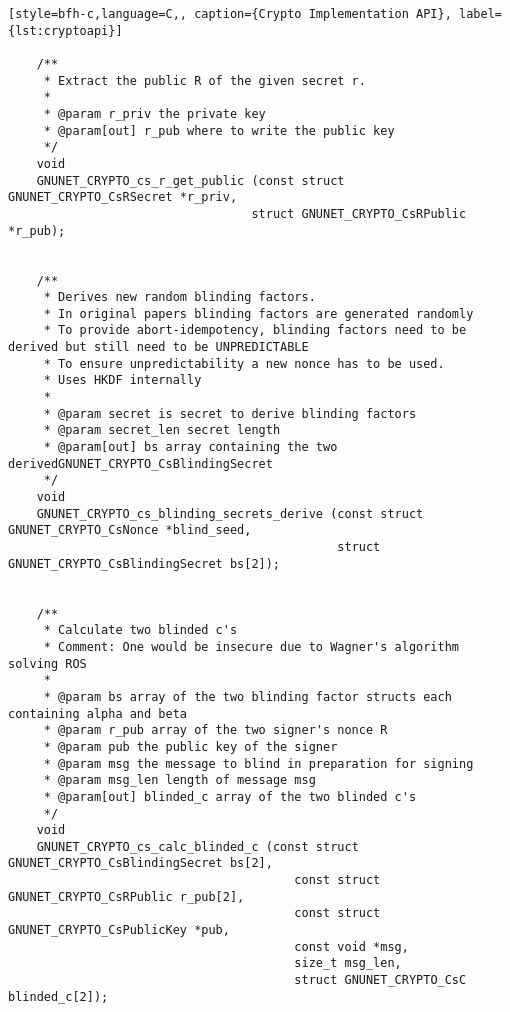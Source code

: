 \begin{lstlisting}[style=bfh-c,language=C,, caption={Crypto Implementation API}, label={lst:cryptoapi}]
    
    /**
     * Extract the public R of the given secret r.
     *
     * @param r_priv the private key
     * @param[out] r_pub where to write the public key
     */
    void
    GNUNET_CRYPTO_cs_r_get_public (const struct GNUNET_CRYPTO_CsRSecret *r_priv,
                                  struct GNUNET_CRYPTO_CsRPublic *r_pub);
    
    
    /**
     * Derives new random blinding factors.
     * In original papers blinding factors are generated randomly
     * To provide abort-idempotency, blinding factors need to be derived but still need to be UNPREDICTABLE
     * To ensure unpredictability a new nonce has to be used.
     * Uses HKDF internally
     * 
     * @param secret is secret to derive blinding factors
     * @param secret_len secret length
     * @param[out] bs array containing the two derivedGNUNET_CRYPTO_CsBlindingSecret
     */
    void
    GNUNET_CRYPTO_cs_blinding_secrets_derive (const struct GNUNET_CRYPTO_CsNonce *blind_seed,
                                              struct GNUNET_CRYPTO_CsBlindingSecret bs[2]);
    
    
    /**
     * Calculate two blinded c's
     * Comment: One would be insecure due to Wagner's algorithm solving ROS
     * 
     * @param bs array of the two blinding factor structs each containing alpha and beta
     * @param r_pub array of the two signer's nonce R
     * @param pub the public key of the signer
     * @param msg the message to blind in preparation for signing
     * @param msg_len length of message msg
     * @param[out] blinded_c array of the two blinded c's
     */
    void
    GNUNET_CRYPTO_cs_calc_blinded_c (const struct GNUNET_CRYPTO_CsBlindingSecret bs[2],
                                        const struct GNUNET_CRYPTO_CsRPublic r_pub[2],
                                        const struct GNUNET_CRYPTO_CsPublicKey *pub,
                                        const void *msg,
                                        size_t msg_len,
                                        struct GNUNET_CRYPTO_CsC blinded_c[2]);
    

\end{lstlisting}

